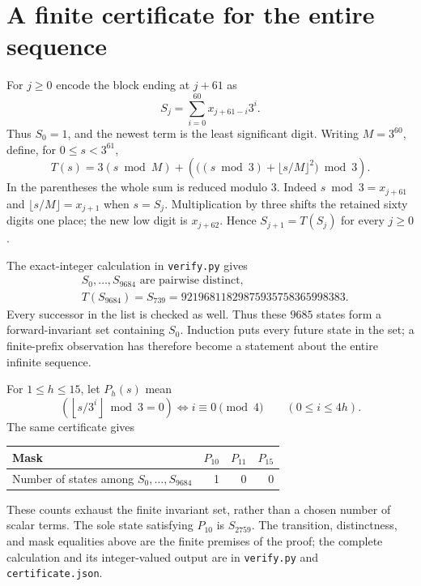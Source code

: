 \documentclass[11pt]{article}
\begin{document}
\section{A finite certificate for the entire sequence}
For $j\ge0$ encode the block ending at $j+61$ as
\[
 S_j=\sum_{i=0}^{60}x_{j+61-i}3^i.
\]
Thus $S_0=1$, and the newest term is the least significant digit.
Writing $M=3^{60}$, define, for $0\le s<3^{61}$,
\begin{equation}\label{eq:transition}
 T(s)=3(s\bmod M)+\left(\bigl((s\bmod3)+\lfloor s/M\rfloor^2\bigr)\bmod3\right).
\end{equation}
In the parentheses the whole sum is reduced modulo $3$.
Indeed $s\bmod3=x_{j+61}$ and $\lfloor s/M\rfloor=x_{j+1}$ when
$s=S_j$. Multiplication by three shifts the retained sixty digits
one place; the new low digit is $x_{j+62}$. Hence
$S_{j+1}=T(S_j)$ for every $j\ge0$.

The exact-integer calculation in \texttt{verify.py} gives
\begin{align}
 &S_0,\ldots,S_{9684}\text{ are pairwise distinct},\label{eq:distinct}\\
 &T(S_{9684})=S_{739}=92196811829875935758365998383.\label{eq:closing}
\end{align}
Every successor in the list is checked as well. Thus these $9685$
states form a forward-invariant set containing $S_0$. Induction
puts every future state in the set; a finite-prefix observation
has therefore become a statement about the entire infinite sequence.

For $1\le h\le15$, let $P_h(s)$ mean
\[
 \left(\left\lfloor s/3^i\right\rfloor\bmod3=0\right)
 \Longleftrightarrow i\equiv0\pmod4
 \qquad(0\le i\le4h).
\]
The same certificate gives
\begin{center}
\begin{tabular}{@{}lrrr@{}}
\toprule
Mask & $P_{10}$ & $P_{11}$ & $P_{15}$\\
\midrule
Number of states among $S_0,\ldots,S_{9684}$ & 1 & 0 & 0\\
\bottomrule
\end{tabular}
\end{center}
These counts exhaust the finite invariant set, rather than a
chosen number of scalar terms. The sole state satisfying $P_{10}$
is $S_{2759}$. The transition, distinctness, and mask equalities above
are the finite premises of the proof; the complete calculation and
its integer-valued output are in \texttt{verify.py} and
\texttt{certificate.json}.
\end{document}
